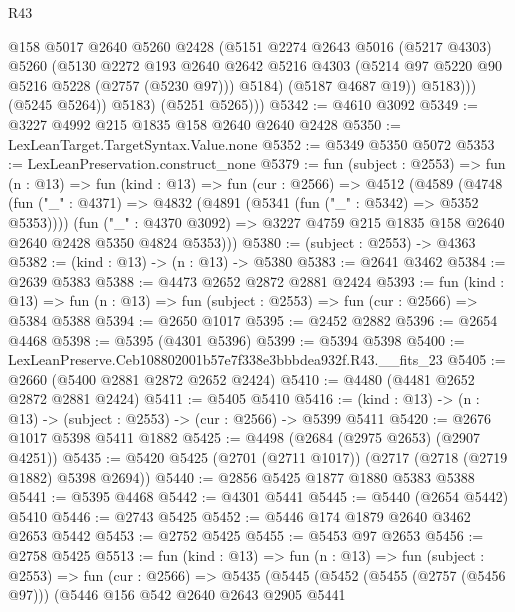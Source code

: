 \begin{lexlean}{R43}
\begin{coremodule}
                  @158
                  @5017
                  @2640
                  @5260
                  @2428
                  (@5151
                    @2274
                    @2643
                    @5016
                    (@5217 @4303)
                    @5260
                    (@5130
                      @2272
                      @193
                      @2640
                      @2642
                      @5216
                      @4303
                      (@5214 @97 @5220 @90 @5216 @5228 (@2757 (@5230 @97)))
                      @5184)
                    (@5187 @4687 @19))
                  @5183)))
            (@5245 @5264))
          @5183)
        (@5251 @5265)))
@5342 := @4610 @3092
@5349 := @3227 @4992 @215 @1835 @158 @2640 @2640 @2428
@5350 := LexLeanTarget.TargetSyntax.Value.none
@5352 := @5349 @5350 @5072
@5353 := LexLeanPreservation.construct_none
@5379 := fun (subject : @2553) =>
  fun (n : @13) =>
  fun (kind : @13) =>
  fun (cur : @2566) =>
  @4512
    (@4589
      (@4748
        (fun ("_" : @4371) => @4832 (@4891 (@5341 (fun ("_" : @5342) => @5352 @5353))))
        (fun ("_" : @4370 @3092) =>
        @3227 @4759 @215 @1835 @158 @2640 @2640 @2428 @5350 @4824 @5353)))
@5380 := (subject : @2553) -> @4363
@5382 := (kind : @13) -> (n : @13) -> @5380
@5383 := @2641 @3462
@5384 := @2639 @5383
@5388 := @4473 @2652 @2872 @2881 @2424
@5393 := fun (kind : @13) =>
  fun (n : @13) => fun (subject : @2553) => fun (cur : @2566) => @5384 @5388
@5394 := @2650 @1017
@5395 := @2452 @2882
@5396 := @2654 @4468
@5398 := @5395 (@4301 @5396)
@5399 := @5394 @5398
@5400 := LexLeanPreserve.Ceb108802001b57e7f338e3bbbdea932f.R43.__fits_23
@5405 := @2660 (@5400 @2881 @2872 @2652 @2424)
@5410 := @4480 (@4481 @2652 @2872 @2881 @2424)
@5411 := @5405 @5410
@5416 := (kind : @13) -> (n : @13) -> (subject : @2553) -> (cur : @2566) -> @5399 @5411
@5420 := @2676 @1017 @5398 @5411 @1882
@5425 := @4498 (@2684 (@2975 @2653) (@2907 @4251))
@5435 := @5420 @5425 (@2701 (@2711 @1017)) (@2717 (@2718 (@2719 @1882) @5398 @2694))
@5440 := @2856 @5425 @1877 @1880 @5383 @5388
@5441 := @5395 @4468
@5442 := @4301 @5441
@5445 := @5440 (@2654 @5442) @5410
@5446 := @2743 @5425
@5452 := @5446 @174 @1879 @2640 @3462 @2653 @5442
@5453 := @2752 @5425
@5455 := @5453 @97 @2653
@5456 := @2758 @5425
@5513 := fun (kind : @13) =>
  fun (n : @13) =>
  fun (subject : @2553) =>
  fun (cur : @2566) =>
  @5435
    (@5445
      (@5452
        (@5455 (@2757 (@5456 @97)))
        (@5446
          @156
          @542
          @2640
          @2643
          @2905
          @5441

\end{coremodule}
\end{lexlean}
